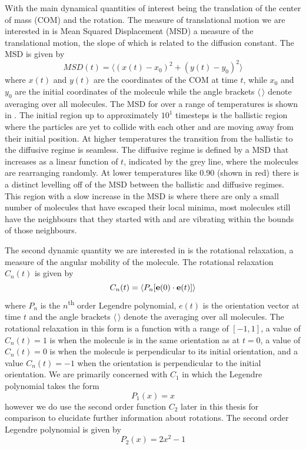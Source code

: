 With the main dynamical quantities of interest being the translation of the center of mass (COM) and the rotation. The measure of translational motion we are interested in is Mean Squared Displacement (MSD) a measure of the translational motion, the slope of which is related to the diffusion constant. The MSD is given by
\begin{equation}
    MSD(t) = \langle (x(t) - x_0)^2 + (y(t) - y_0)^2 \rangle
\end{equation}
where $x(t)$ and $y(t)$ are the coordinates of the COM at time $t$, while $x_0$ and $y_0$ are the initial coordinates of the molecule while the angle brackets $\langle\,\rangle$ denote averaging over all molecules. The MSD for \sone over a range of temperatures is shown in . The initial region up to approximately $10^1$ timesteps is the ballistic region where the particles are yet to collide with each other and are moving away from their initial position. At higher temperatures the transition from the ballistic to the diffusive regime is seamless. The diffusive regime is defined by a MSD that increases as a linear function of $t$, indicated by the grey line, where the molecules are rearranging randomly. At lower temperatures like \num{0.90} (shown in red) there is a distinct levelling off of the MSD between the ballistic and diffusive regimes. This region with a slow increase in the MSD is where there are only a small number of molecules that have escaped their local minima, most molecules still have the neighbours that they started with and are vibrating within the bounds of those neighbours.

The second dynamic quantity we are interested in is the rotational relaxation, a measure of the angular mobility of the molecule. The rotational relaxation $C_n(t)$ is given by
\begin{equation}
    C_n(t) = \langle P_n[\mathbf{e}(0) \cdot \mathbf{e}(t)] \rangle
\end{equation}
where $P_n$ is the $n$\textsuperscript{th} order Legendre polynomial, $e(t)$ is the orientation vector at time $t$ and the angle brackets $\langle\,\rangle$ denote the averaging over all molecules. The rotational relaxation in this form is a function with a range of $[-1,1]$, a value of $C_n(t)=1$ is when the molecule is in the same orientation as at $t=0$, a value of $C_n(t)=0$ is when the molecule is perpendicular to its initial orientation, and a value $C_n(t)=-1$ when the orientation is perpendicular to the initial orientation\tofix. We are primarily concerned with $C_1$ in which the Legendre polynomial takes the form
\begin{equation}
    P_1(x) = x
\end{equation}
however we do use the second order function $C_2$ later in this thesis for comparison to elucidate further information about rotations. The second order Legendre polynomial is given by
\begin{equation}
    P_2(x) = 2x^2 - 1
\end{equation}

